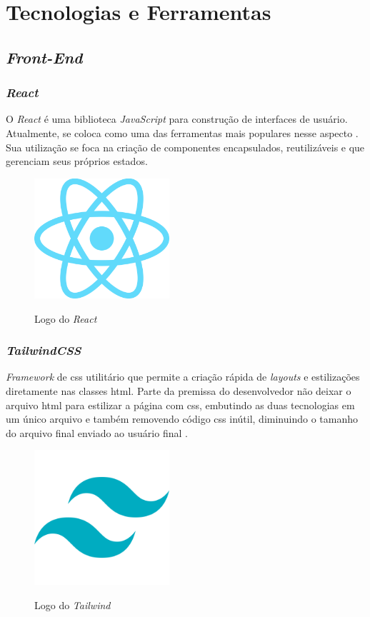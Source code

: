 \section{Tecnologias e Ferramentas} 

\subsection{\emph{Front-End}} 

\subsubsection{\emph{React}} 
O \emph{React} \cite{react} é uma biblioteca \emph{JavaScript} para construção de interfaces de usuário. Atualmente, se coloca como uma das ferramentas mais populares nesse aspecto \cite{state-of-front-end}. Sua utilização se foca na criação de componentes encapsulados, reutilizáveis e que gerenciam seus próprios estados.

\begin{figure}[htb]
	\caption{Logo do \emph{React}}
	\centering
	\includegraphics[width=5cm]{cap04-desenvolvimento/images/4-4-1-1-react}
	\label{fig:logo_react}
\end{figure}
\FloatBarrier

\subsubsection{\emph{TailwindCSS}} 
\emph{Framework} de \gls{css} utilitário que permite a criação rápida de \emph{layouts} e estilizações diretamente nas classes \gls{html}. Parte da premissa do desenvolvedor não deixar o arquivo \gls{html} para estilizar a página com \gls{css}, embutindo as duas tecnologias em um único arquivo e também removendo código \gls{css} inútil, diminuindo o tamanho do arquivo final enviado ao usuário final \cite{tailwind}.

\begin{figure}[htb]
	\centering
	\caption{Logo do \emph{Tailwind}}
	\includegraphics[width=5cm]{cap04-desenvolvimento/images/4-4-1-2-tailwindcss-logo.png}
	\label{fig:logo_tailwind}
\end{figure}
\FloatBarrier

